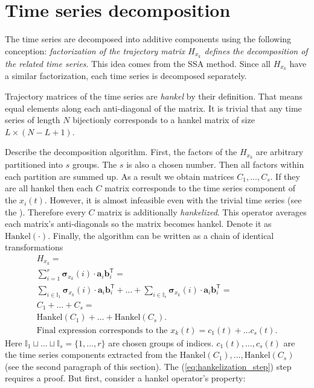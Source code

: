 \documentclass[referee, pdflatex, sn-mathphys-num]{sn-jnl}
\theoremstyle{definition}
\theoremstyle{plain}
\begin{document}
	\section{Time series decomposition}\label{sec:decomposition}
	
	The time series are decomposed into additive components using the following conception: \emph{factorization of the trajectory matrix $ H_{x_k} $ defines the decomposition of the related time series}. This idea comes from the SSA method. Since all $ H_{x_k} $ have a similar factorization, each time series is decomposed separately.
	
	Trajectory matrices of the time series are \emph{hankel} by their definition. That means equal elements along each anti-diagonal of the matrix. It is trivial that any time series of length $ N $ bijectionly corresponds to a hankel matrix of size $ L \times (N - L + 1) $.
	
	Describe the decomposition algorithm. First, the factors of the $ H_{x_k} $ are arbitrary partitioned into $ s $ groups. The $ s $ is also a chosen number. Then all factors within each partition are summed up. As a result we obtain matrices $ C_1, \ldots, C_s $. If they are all hankel then each $ C $ matrix corresponds to the time series component of the $ x_i(t) $. However, it is almost infeasible even with the trivial time series (see the \cite{ecfb9dc578be43ae9ee8fc88b8ff9151}). Therefore every $ C $ matrix is additionally \emph{hankelized}. This operator averages each matrix's anti-diagonals so the matrix becomes hankel. Denote it as $ \text{Hankel}(\cdot) $. Finally, the algorithm can be written as a chain of identical transformations \begin{gather}
		H_{x_k} = \\
		\sum\limits_{i = 1}^{r} \boldsymbol{\sigma}_{x_k}(i) \cdot \mathbf{a}_i  \mathbf{b}_i^{\mathsf{T}} = \label{eq:decomp_alg_first_step} \\
		\sum\limits_{i \in \mathbb{I}_1} \boldsymbol{\sigma}_{x_k}(i) \cdot \mathbf{a}_i  \mathbf{b}_i^{\mathsf{T}} + \ldots + \sum\limits_{i \in \mathbb{I}_s} \boldsymbol{\sigma}_{x_k}(i) \cdot \mathbf{a}_i  \mathbf{b}_i^{\mathsf{T}} = \\
		C_1 + \ldots + C_s = \label{eq:hankelization_step} \\
	    \text{Hankel}(C_1) + \ldots + \text{Hankel}(C_s). \nonumber \\
	    \text{Final expression corresponds to the } x_k(t) = c_1(t) + \ldots c_s(t). \nonumber
	\end{gather} Here $ \mathbb{I}_1 \sqcup \ldots \sqcup \mathbb{I}_s = \{1, \ldots, r\} $ are chosen groups of indices. $ c_1(t), \ldots , c_s(t) $ are the time series components extracted from the $ \text{Hankel}(C_1), \ldots , \text{Hankel}(C_s) $ (see the second paragraph of this section). The (\ref{eq:hankelization_step}) step requires a proof. But first, consider a hankel operator's property:
	
\end{document}
